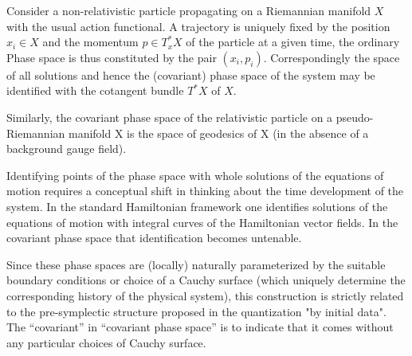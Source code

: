 \documentclass[Main]{subfiles}
\begin{document}
		\begin{example}
			Consider a non-relativistic particle propagating on a Riemannian manifold $X$ with the usual action functional.
			A trajectory is uniquely fixed by the position $x_i \in X$ and the momentum $p\in T^*_x X$ of the particle at a given time, the ordinary Phase space is thus constituted by the pair $(x_i, p_i)$.
			Correspondingly the space of all solutions and hence the (covariant) phase space of the system may be identified with the cotangent bundle $T^*X$ of $X$.
			
			Similarly, the covariant phase space of the relativistic particle on a pseudo-Riemannian manifold X is the space of geodesics of X (in the absence of a background gauge field).
		\end{example}
		Identifying points of the phase space with whole solutions of the equations of motion requires a conceptual shift in thinking about the time development of the system.
		In the standard Hamiltonian framework one identifies solutions of the equations of motion with integral curves of the Hamiltonian vector fields. In the covariant phase space that identification becomes untenable.


		Since these phase spaces are (locally) naturally parameterized by the suitable boundary conditions or choice of a Cauchy surface (which uniquely determine the corresponding history of the physical system), 
		this construction is strictly related to the pre-symplectic structure proposed in the quantization "by initial data".
		The “covariant” in “covariant phase space” is to indicate that it comes without any particular choices of Cauchy surface.
\end{document}
